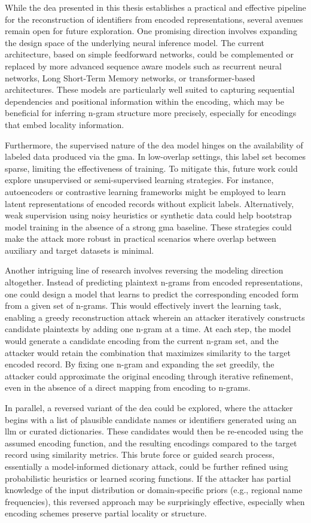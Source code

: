 While the \ac{dea} presented in this thesis establishes a practical and effective pipeline for the reconstruction of identifiers from encoded representations, several avenues remain open for future exploration.
One promising direction involves expanding the design space of the underlying neural inference model.
The current architecture, based on simple feedforward networks, could be complemented or replaced by more advanced sequence aware models such as recurrent neural networks, Long Short-Term Memory networks, or transformer-based architectures.
These models are particularly well suited to capturing sequential dependencies and positional information within the encoding, which may be beneficial for inferring n-gram structure more precisely, especially for encodings that embed locality information.

Furthermore, the supervised nature of the \ac{dea} model hinges on the availability of labeled data produced via the \ac{gma}.
In low-overlap settings, this label set becomes sparse, limiting the effectiveness of training.
To mitigate this, future work could explore unsupervised or semi-supervised learning strategies.
For instance, autoencoders or contrastive learning frameworks might be employed to learn latent representations of encoded records without explicit labels.
Alternatively, weak supervision using noisy heuristics or synthetic data could help bootstrap model training in the absence of a strong \ac{gma} baseline.
These strategies could make the attack more robust in practical scenarios where overlap between auxiliary and target datasets is minimal.

Another intriguing line of research involves reversing the modeling direction altogether.
Instead of predicting plaintext n-grams from encoded representations, one could design a model that learns to predict the corresponding encoded form from a given set of n-grams.
This would effectively invert the learning task, enabling a greedy reconstruction attack wherein an attacker iteratively constructs candidate plaintexts by adding one n-gram at a time.
At each step, the model would generate a candidate encoding from the current n-gram set, and the attacker would retain the combination that maximizes similarity to the target encoded record.
By fixing one n-gram and expanding the set greedily, the attacker could approximate the original encoding through iterative refinement, even in the absence of a direct mapping from encoding to n-grams.

In parallel, a reversed variant of the \ac{dea} could be explored, where the attacker begins with a list of plausible candidate names or identifiers generated using an \ac{llm} or curated dictionaries.
These candidates would then be re-encoded using the assumed encoding function, and the resulting encodings compared to the target record using similarity metrics.
This brute force or guided search process, essentially a model-informed dictionary attack, could be further refined using probabilistic heuristics or learned scoring functions.
If the attacker has partial knowledge of the input distribution or domain-specific priors (e.g., regional name frequencies), this reversed approach may be surprisingly effective, especially when encoding schemes preserve partial locality or structure.

